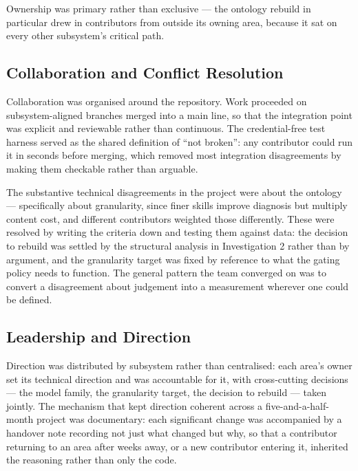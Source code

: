 Ownership was primary rather than exclusive --- the ontology rebuild in
particular drew in contributors from outside its owning area, because it sat on
every other subsystem's critical path.

\subsection{Collaboration and Conflict Resolution}
\label{sec:collaboration}

Collaboration was organised around the repository. Work proceeded on
subsystem-aligned branches merged into a main line, so that the integration
point was explicit and reviewable rather than continuous. The credential-free
test harness served as the shared definition of ``not broken'': any contributor
could run it in seconds before merging, which removed most integration
disagreements by making them checkable rather than arguable.

The substantive technical disagreements in the project were about the ontology
--- specifically about granularity, since finer skills improve diagnosis but
multiply content cost, and different contributors weighted those differently.
These were resolved by writing the criteria down and testing them against data:
the decision to rebuild was settled by the structural analysis in Investigation
2 rather than by argument, and the granularity target was fixed by reference to
what the gating policy needs to function. The general pattern the team
converged on was to convert a disagreement about judgement into a measurement
wherever one could be defined.


\subsection{Leadership and Direction}
\label{sec:leadership}

Direction was distributed by subsystem rather than centralised: each area's
owner set its technical direction and was accountable for it, with cross-cutting
decisions --- the model family, the granularity target, the decision to rebuild
--- taken jointly. The mechanism that kept direction coherent across a
five-and-a-half-month project was documentary: each significant change was
accompanied by a handover note recording not just what changed but why, so that
a contributor returning to an area after weeks away, or a new contributor
entering it, inherited the reasoning rather than only the code.

